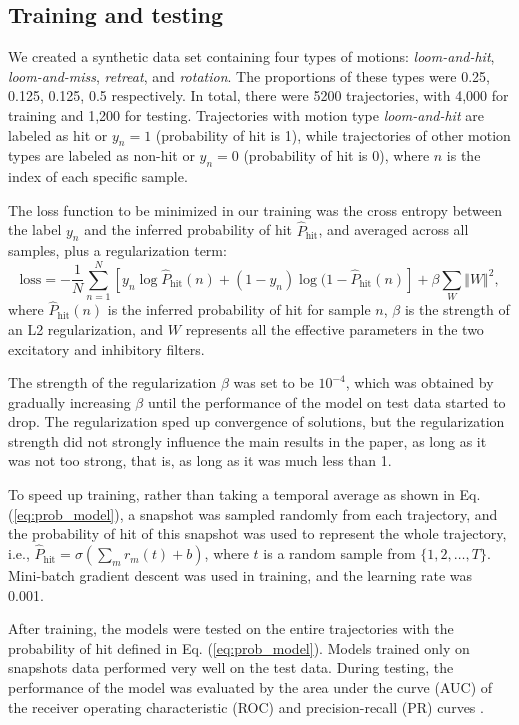 \documentclass[9pt,lineno]{elife}
\let\hat\widehat
\begin{document}
\subsection{Training and testing}
We created a synthetic data set containing four types of motions: \emph{loom-and-hit}, \emph{loom-and-miss}, \emph{retreat}, and \emph{rotation}. The proportions of these types were 0.25, 0.125, 0.125, 0.5 respectively. In total, there were 5200 trajectories, with 4,000 for training and 1,200 for testing. Trajectories with motion type \emph{loom-and-hit} are labeled as hit or $y_{n}=1$ (probability of hit is 1), while trajectories of other motion types are labeled as non-hit or $y_{n}=0$ (probability of hit is 0), where $n$ is the index of each specific sample. 

The loss function to be minimized in our training was the cross entropy between the label $y_{n}$ and the inferred probability of hit $\hat{P}_{\text{hit}}$, and averaged across all samples, plus a regularization term: 
\begin{equation}
\text{loss}=-\frac{1}{N}\sum_{n=1}^{N}\left[ y_{n}\log \hat{P}_{\text{hit}}(n)+(1-y_{n})\log (1-\hat{P}_{\text{hit}}(n) \right]+\beta\sum_{W}\Vert W \Vert^{2},
\end{equation}
where $\hat{P}_{\text{hit}}(n)$ is the inferred probability of hit for sample $n$, $\beta$ is the strength of an L2 regularization, and $W$ represents all the effective parameters in the two excitatory and inhibitory filters. 

The strength of the regularization $\beta$ was set to be $10^{-4}$, which was obtained by gradually increasing $\beta$ until the performance of the model on test data started to drop. The regularization sped up convergence of solutions, but the regularization strength did not strongly influence the main results in the paper, as long as it was not too strong, that is, as long as it was much less than 1. 

To speed up training, rather than taking a temporal average as shown in Eq. (\ref{eq:prob_model}), a snapshot was sampled randomly from each trajectory, and the probability of hit of this snapshot was used to represent the whole trajectory, i.e., $\hat{P}_{\text{hit}}=\sigma \left( \sum_{m}r_{m}(t)+b \right)$, where $t$ is a random sample from $\{1,2,\dots,T\}$. Mini-batch gradient descent was used in training, and the learning rate was 0.001.

After training, the models were tested on the entire trajectories with the probability of hit defined in Eq. (\ref{eq:prob_model}). Models trained only on snapshots data performed very well on the test data. During testing, the performance of the model was evaluated by the area under the curve (AUC) of the receiver operating characteristic (ROC) and precision-recall (PR) curves \citep{hanley1982meaning,davis2006relationship}. 
\end{document}
